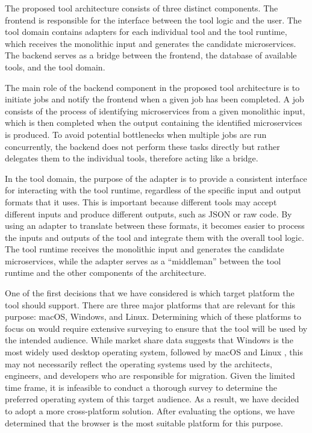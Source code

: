 \documentclass[conference]{IEEEtran}
\begin{document}
The proposed tool architecture consists of three distinct components. The
frontend is responsible for the interface between the tool logic and the user.
The tool domain contains adapters for each individual tool and the tool
runtime, which receives the monolithic input and generates the candidate
microservices. The backend serves as a bridge between the frontend, the
database of available tools, and the tool domain.

The main role of the backend component in the proposed tool architecture is to
initiate jobs and notify the frontend when a given job has been completed. A
job consists of the process of identifying microservices from a given
monolithic input, which is then completed when the output containing the
identified microservices is produced. To avoid potential bottlenecks when
multiple jobs are run concurrently, the backend does not perform these tasks
directly but rather delegates them to the individual tools, therefore acting
like a bridge.

In the tool domain, the purpose of the adapter is to provide a consistent
interface for interacting with the tool runtime, regardless of the specific
input and output formats that it uses. This is important because different
tools may accept different inputs and produce different outputs, such as JSON
or raw code. By using an adapter to translate between these formats, it becomes
easier to process the inputs and outputs of the tool and integrate them with
the overall tool logic. The tool runtime receives the monolithic input and
generates the candidate microservices, while the adapter serves as a
``middleman'' between the tool runtime and the other components of the
architecture.

One of the first decisions that we have considered is which target platform the
tool should support. There are three major platforms that are relevant for this
purpose: macOS, Windows, and Linux. Determining which of these platforms to
focus on would require extensive surveying to ensure that the tool will be used
by the intended audience. While market share data suggests that Windows is the
most widely used desktop operating system, followed by macOS and Linux
\cite{desktop-usage-worldwide}, this may not necessarily reflect the operating
systems used by the architects, engineers, and developers who are responsible
for migration. Given the limited time frame, it is infeasible to conduct a
thorough survey to determine the preferred operating system of this target
audience. As a result, we have decided to adopt a more cross-platform solution.
After evaluating the options, we have determined that the browser is the most
suitable platform for this purpose.
\end{document}
